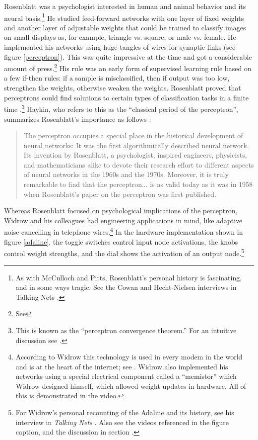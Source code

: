 Rosenblatt was a psychologist interested in human and animal behavior and its neural basis.\footnote{As with McCulloch and Pitts, Rosenblatt's personal history is fascinating, and in some ways tragic. See the Cowan and Hecht-Nielsen interviews in Talking Nets \cite{anderson2000talking}.} He studied feed-forward networks with one layer of fixed weights and another layer of adjustable weights that could be trained to classify images on small displays as, for example, triangle vs. square, or male vs. female. He implemented his networks using huge tangles of wires for synaptic links (see figure \ref{perceptron}). This was quite impressive at the time and got a considerable amount of press.\footnote{See } His rule was an early form of supervised learning rule based on a few if-then rules: if a sample is misclassified, then if output was too low, strengthen the weights, otherwise weaken the weights. Rosenblatt proved that perceptrons could find solutions to certain types of classification tasks in a finite time \cite{rosenblatt1962comparison}.\footnote{This is known as the ``perceptron convergence theorem.'' For an intuitive discussion see .} Haykin, who refers to this as the ``classical period of the perceptron'', summarizes Rosenblatt's importance as follows \cite{haykin1998neural}:
\begin{quotation}
The perceptron occupies a special place in the historical development of neural networks: It was the first algorithmically described neural network. Its invention by Rosenblatt, a psychologist, inspired engineers, physicists, and mathematicians alike to devote their research effort to different aspects of neural networks in the 1960s and the 1970s. Moreover, it is truly remarkable to find that the perceptron... is as valid today as it was in 1958 when Rosenblatt's paper on the perceptron was first published.
\end{quotation}

Whereas Rosenblatt focused on psychological implications of the perceptron, Widrow and his colleagues had engineering applications in mind, like adaptive noise cancelling in telephone wires.\footnote{According to Widrow this technology is used in every modem in the world and is at the heart of the internet; see . Widrow also implemented his networks using a special electrical component called a ``memistor'' which Widrow designed himself, which allowed weight updates in hardware. All of this is demonstrated in the video.} In the hardware implementation shown in figure \ref{adaline}, the toggle switches control input node activations, the knobs control weight strengths, and the dial shows the activation of an output node.\footnote{For Widrow's personal recounting of the Adaline and its history, see his interview in \emph{Talking Nets} \cite{anderson2000talking}. Also see the videos referenced in the figure caption, and the discussion in section .}

